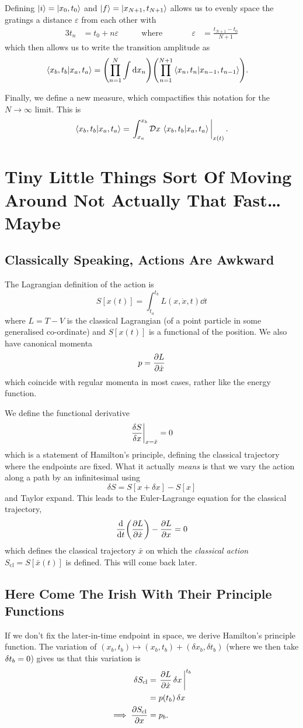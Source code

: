 \documentclass[]{revision-notes}
\begin{document}
Defining \(\ket{i} = \ket{x_0, t_0} \) and \( \ket{f} = \ket{x_{N+1}, t_{N+1}} \) allows us to evenly space the gratings a distance \( \varepsilon \) from each other with
\begin{alignat*}{3}
  t_n &= t_0 + n\varepsilon & \qquad \text{where}&\qquad& \varepsilon &= \frac{t_{N+1} - t_0}{N+1}
\end{alignat*}
which then allows us to write the transition amplitude as
\begin{align*}
  \braket{x_b, t_b}{x_a, t_a} &= \qty(\prod_{n=1}^{N}\int\dd{x_n})\qty(\prod_{n=1}^{N+1}\braket{x_{n}, t_{n}}{x_{n-1}, t_{n-1}}).
\end{align*}

Finally, we define a new measure, which compactifies this notation for the \(N \to \infty \) limit.
This is \[ \braket{x_b, t_b}{x_a, t_a} =  \eval{\int_{x_a}^{x_b}\DD{x}\braket{x_b, t_b}{x_a, t_a}}_{x(t)}. \]

\chapter{Tiny Little Things Sort Of Moving Around Not Actually That Fast\ldots{} Maybe}
\section{Classically Speaking, Actions Are Awkward}
The Lagrangian definition of the action is \[ S[x(t)] = \int_{t_a}^{t_b} L(x, \dot{x}, t) \dd{t} \]
where \(L = T-V \) is the classical Lagrangian (of a point particle in some generalised co-ordinate) and \(S[x(t)]\) is a functional of the position. We also have canonical momenta \[ p = \pdv{L}{\dot{x}} \] which coincide with regular momenta in most cases, rather like the energy function.

We define the functional derivative
\[ \eval{\frac{\delta S}{\delta x}}_{x = \bar x} = 0 \] which is a statement of Hamilton's principle, defining the classical trajectory where the endpoints are fixed. What it actually \emph{means} is that we vary the action along a path by an infinitesimal using \[ \delta S = S[x + \delta x] - S[x] \] and Taylor expand. This leads to the Euler-Lagrange equation for the classical trajectory, \[ \dv{t}(\pdv{L}{\dot x}) - \pdv{L}{x} = 0 \] which defines the classical trajectory \(\bar{x} \) on which the \emph{classical action}
\(S_{\mathrm{cl}} = S[\bar x(t)]\) is defined. This will come back later.

\section{Here Come The Irish With Their Principle Functions}
If we don't fix the later-in-time endpoint in space, we derive Hamilton's principle function.
The variation of \( (x_b, t_b) \mapsto (x_b, t_b) + (\delta x_b, \delta t_b)\) (where we then take \(\variation{t_b} = 0\)) gives us that this variation is \begin{align*}
  \variation{S_{\mathrm{cl}}} &= \eval{\pdv{L}{\dot{x}}\variation{x}}^{t_b}\\
  &= p(t_b)\variation{x}\\
  \implies \pdv{S_{\mathrm{cl}}}{x} &= p_b.
\end{align*}
\end{document}
